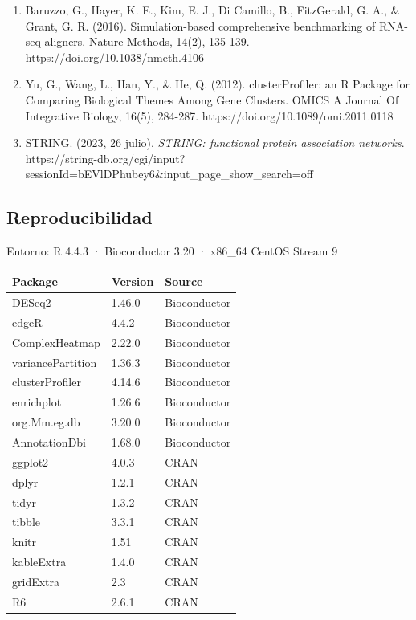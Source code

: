 \documentclass[
  9pt,
]{article}
\newcounter{none} %
\begin{document}
\begin{enumerate}
  Resolution Using the Arabidopsis~thaliana Genome. Plants, 13(5), 582.
  https://doi.org/10.3390/plants13050582
\item
  Baruzzo, G., Hayer, K. E., Kim, E. J., Di Camillo, B., FitzGerald, G.
  A., \& Grant, G. R. (2016). Simulation-based comprehensive
  benchmarking of RNA-seq aligners. Nature Methods, 14(2), 135-139.
  https://doi.org/10.1038/nmeth.4106
\item
  Yu, G., Wang, L., Han, Y., \& He, Q. (2012). clusterProfiler: an R
  Package for Comparing Biological Themes Among Gene Clusters. OMICS A
  Journal Of Integrative Biology, 16(5), 284-287.
  https://doi.org/10.1089/omi.2011.0118
\item
  STRING. (2023, 26 julio). \emph{STRING: functional protein association
  networks}.
  https://string-db.org/cgi/input?sessionId=bEVlDPhubey6\&input\_page\_show\_search=off
\end{enumerate}

\subsection{Reproducibilidad}\label{reproducibilidad}

Entorno: R 4.4.3 · Bioconductor 3.20 · x86\_64 CentOS Stream 9

{\def\LTcaptype{none} %
\begin{longtable}[]{@{}lll@{}}
\toprule\noalign{}
Package & Version & Source \\
\midrule\noalign{}
\endhead
\bottomrule\noalign{}
\endlastfoot
DESeq2 & 1.46.0 & Bioconductor \\
edgeR & 4.4.2 & Bioconductor \\
ComplexHeatmap & 2.22.0 & Bioconductor \\
variancePartition & 1.36.3 & Bioconductor \\
clusterProfiler & 4.14.6 & Bioconductor \\
enrichplot & 1.26.6 & Bioconductor \\
org.Mm.eg.db & 3.20.0 & Bioconductor \\
AnnotationDbi & 1.68.0 & Bioconductor \\
ggplot2 & 4.0.3 & CRAN \\
dplyr & 1.2.1 & CRAN \\
tidyr & 1.3.2 & CRAN \\
tibble & 3.3.1 & CRAN \\
knitr & 1.51 & CRAN \\
kableExtra & 1.4.0 & CRAN \\
gridExtra & 2.3 & CRAN \\
R6 & 2.6.1 & CRAN \\
\end{longtable}
}
\end{document}
